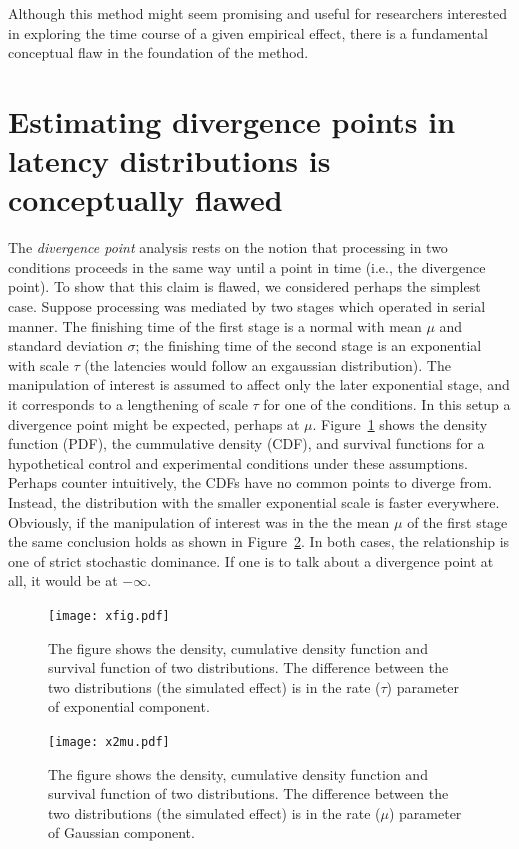 \documentclass[man]{apa}%
\begin{document}
      Although this method might seem  promising and useful for researchers interested in exploring the time course of a given  empirical effect, there is a fundamental conceptual flaw in the foundation of the method.

\section{Estimating divergence points in latency distributions is conceptually flawed}

The \emph{divergence point} analysis rests on the notion that processing in two conditions proceeds in the same way until a point in time  (i.e., the divergence point). To show that this claim is flawed, we considered perhaps the simplest case.  Suppose processing was mediated by two stages which operated in serial manner.  The finishing time of the first stage is a normal with mean $\mu$ and standard deviation $\sigma$; the finishing time of the second stage is an exponential with scale $\tau$ (the latencies would follow an exgaussian distribution).  The manipulation of interest is assumed to affect only the later exponential stage, and it corresponds to a lengthening of scale $\tau$ for one of the conditions.   In this setup a divergence point might be expected, perhaps at $\mu$.  Figure~\ref{fig:x} shows the density function (PDF), the cummulative density (CDF), and survival functions for a hypothetical control and experimental conditions under these assumptions.  Perhaps counter intuitively, the CDFs have no common points to diverge from.  Instead, the distribution with the smaller exponential scale is faster everywhere. Obviously, if the manipulation of interest was in the the mean $\mu$ of the first stage the same conclusion holds as shown in Figure~\ref{fig:mu}. In both cases, the relationship is one of strict stochastic dominance.   If one is to talk about a divergence point at all, it would be at  $-\infty.$



\begin{figure}[h] %
	\texttt{[image: xfig.pdf]}
	\caption{The figure shows the density, cumulative density function and survival function of two distributions. The difference between the two distributions (the simulated effect) is in the rate ($\tau$) parameter of exponential component.}
		\label{fig:x}
\end{figure}



\begin{figure}[h] %
	\texttt{[image: x2mu.pdf]}
	\caption{The figure shows the density, cumulative density function and survival function of two distributions. The difference between the two distributions (the simulated effect) is in the rate ($\mu$) parameter of Gaussian component.}
		\label{fig:mu}
\end{figure}
\end{document}
